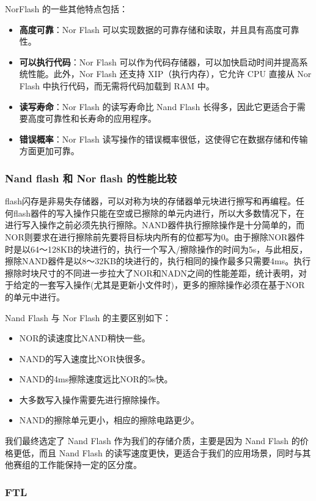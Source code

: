 NorFlash 的一些其他特点包括：

\begin{itemize}
  \item {\bf{高度可靠}}：Nor Flash 可以实现数据的可靠存储和读取，并且具有高度可靠性。
  \item {\bf{可以执行代码}}：Nor Flash 可以作为代码存储器，可以加快启动时间并提高系统性能。此外，Nor Flash 还支持 XIP（执行内存），它允许 CPU 直接从 Nor Flash 中执行代码，而无需将代码加载到 RAM 中。
  \item {\bf{读写寿命}}：Nor Flash 的读写寿命比 Nand Flash 长得多，因此它更适合于需要高度可靠性和长寿命的应用程序。
  \item {\bf{错误概率}}：Nor Flash 读写操作的错误概率很低，这使得它在数据存储和传输方面更加可靠。
\end{itemize}

\subsubsection*{Nand flash 和 Nor flash 的性能比较}

flash闪存是非易失存储器，可以对称为块的存储器单元块进行擦写和再编程。任何flash器件的写入操作只能在空或已擦除的单元内进行，所以大多数情况下，在进行写入操作之前必须先执行擦除。NAND器件执行擦除操作是十分简单的，而NOR则要求在进行擦除前先要将目标块内所有的位都写为0。由于擦除NOR器件时是以64～128KB的块进行的，执行一个写入/擦除操作的时间为5s，与此相反，擦除NAND器件是以8～32KB的块进行的，执行相同的操作最多只需要4ms。执行擦除时块尺寸的不同进一步拉大了NOR和NADN之间的性能差距，统计表明，对于给定的一套写入操作(尤其是更新小文件时)，更多的擦除操作必须在基于NOR的单元中进行。

Nand Flash 与 Nor Flash 的主要区别如下：

\begin{itemize}
  \item NOR的读速度比NAND稍快一些。
  \item NAND的写入速度比NOR快很多。
  \item NAND的4ms擦除速度远比NOR的5s快。
  \item 大多数写入操作需要先进行擦除操作。
  \item NAND的擦除单元更小，相应的擦除电路更少。
\end{itemize}

我们最终选定了 Nand Flash 作为我们的存储介质，主要是因为 Nand Flash 的价格更低，而且 Nand Flash 的读写速度更快，更适合于我们的应用场景，同时与其他赛组的工作能保持一定的区分度。

\subsubsection{FTL}

